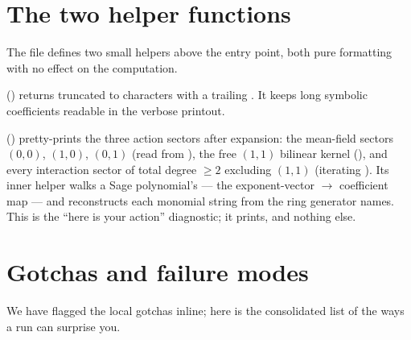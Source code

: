 \section{The two helper functions}\label{sec:co-helpers}

The file defines two small helpers above the entry point, both pure formatting
with no effect on the computation.

 () returns
 truncated to  characters with a trailing .
It keeps long symbolic coefficients readable in the verbose printout.

 () pretty-prints
the three action sectors after expansion: the mean-field sectors $(0,0)$,
$(1,0)$, $(0,1)$ (read from ), the free $(1,1)$
bilinear kernel (), and every interaction sector of total
degree $\ge2$ excluding $(1,1)$ (iterating ). Its inner helper
 walks a Sage polynomial's  --- the
exponent-vector $\to$ coefficient map --- and reconstructs each monomial string
from the ring generator names. This is the ``here is your action'' diagnostic; it
prints, and nothing else.

\section{Gotchas and failure modes}\label{sec:co-gotchas}

We have flagged the local gotchas inline; here is the consolidated list of the
ways a  run can surprise you.

